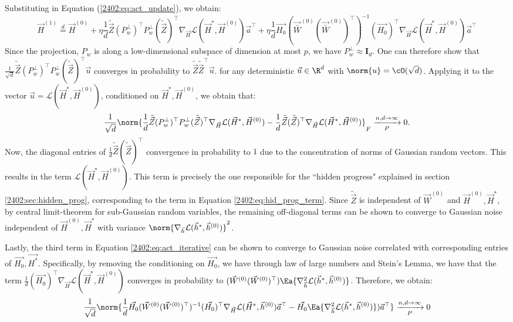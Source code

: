 Substituting in Equation (\eqref{2402:eq:act_update}), we obtain:
\begin{equation}\label{2402:eq:act_iterative}
    \vec{H}^{(1)} \overset{d}{=} \vec{H}^{(0)} +
    \eta \frac{1}{d}\tilde{\vec{Z}}(P^{\perp}_w)^\top P^{\perp}_w(\tilde{\vec{Z}})^\top \nabla_{\vec{H}} \mathcal{L}(\vec{H}^*, \vec{H}^{(0)})\vec{a}^\top + \eta\frac{1}{d}\vec{H_0}(\vec{\bar{W}}^{(0)}(\vec{\bar{W}}^{(0)})^\top)^{-1}(\vec{H_0})^\top \nabla_{\vec{H}} \mathcal{L}(\vec{H}^*, \vec{H}^{(0)})\vec{a}^\top
\end{equation}
Since the projection, $P_w$ is along a low-dimensional subspace of dimension at most $p$, we have $P^{\perp}_w \approx \mathbf{I}_d$. 
One can therefore show that $\frac{1}{\sqrt{d}}\tilde{\vec{Z}}(P^{\perp}_w)^\top P^{\perp}_w(\tilde{\vec{Z}})^\top \vec{u}$ converges in probability to $\tilde{\vec{Z}} \tilde{\vec{Z}}^\top \vec{u}$. for any deterministic $\vec{u} \in \R^d$ with $\norm{u}= \cO(\sqrt{d})$. Applying it to the vector $\vec{u} = \mathcal{L}(\vec{H}^*, \vec{H}^{(0)})$, conditioned on $\vec{H}^*, \vec{H}^{(0)}$, we obtain that:
\begin{equation}
 \frac{1}{\sqrt{d}}\norm{\frac{1}{d}\tilde{\vec{Z}}(P^{\perp}_w)^\top P^{\perp}_w(\tilde{\vec{Z}})^\top \nabla_{\vec{H}} \mathcal{L}(\vec{H}^*, \vec{H}^{(0)}) - \frac{1}{d}\tilde{\vec{Z}}(\tilde{\vec{Z}})^\top \nabla_{\vec{H}}\mathcal{L}(\vec{H}^*, \vec{H}^{(0)})}_F    \xrightarrow[P]{n,d \rightarrow \infty} 0. 
\end{equation}
Now, the diagonal entries of $\frac{1}{d}\tilde{\vec{Z}}(\tilde{\vec{Z}})^\top$ convergence in probability to $1$ due to the concentration of norms of Gaussian random vectors. This results in the term $\mathcal{L}(\vec{H}^*, \vec{H}^{(0)})$. This term is precisely the one responsible for the ``hidden progress" explained in section \ref{2402:sec:hidden_prog}, corresponding to the term in Equation \ref{2402:eq:hid_prog_term}. Since $\tilde{\vec{Z}}$ is independent of $\vec{W}^{(0)}$ and $\vec{H}^{(0)}, \vec{H}^*$, by central limit-theorem for sub-Gaussian random variables, the remaining off-diagonal terms can be shown to converge to Gaussian noise independent of $\vec{H}^{(0)}, \vec{H}^*$ with variance $\norm{\nabla_{\vec{h}} \mathcal{L}(\vec{h}^*, \vec{h}^{(0)})}^2$. 

Lastly, the third term in Equation \eqref{2402:eq:act_iterative} can be shown to converge to Gaussian noise correlated with corresponding entries of $\vec{H_0},\vec{H^*}$.
Specifically, by removing the conditioning on $\vec{H_0}$, we have through law of large numbers and Stein's Lemma, we have that the term $\frac{1}{d}(\vec{H_0})^\top \nabla_{\vec{H}} \mathcal{L}(\vec{H}^*, \vec{H}^{(0)})$ converges in probability to $(\vec{W}^{(0)}(\vec{W}^{(0)})^\top) \Ea{\nabla^2_{\vec{h}}\mathcal{L}(\vec{h}^*, \vec{h}^{(0)})}$. Therefore, we obtain:
\begin{equation}
    \frac{1}{\sqrt{d}}\norm{\frac{1}{d}\vec{H_0}(\vec{W}^{(0)}(\vec{W}^{(0)})^\top)^{-1}(\vec{H_0})^\top \nabla_{\vec{H}} \mathcal{L}(\vec{H}^*, \vec{h}^{(0)})\vec{a}^\top - \vec{H_0}\Ea{\nabla^2_{\vec{h}}\mathcal{L}(\vec{h}^*, \vec{h}^{(0)})})\vec{a}^\top} \xrightarrow[P]{n,d \rightarrow \infty} 0
\end{equation}


